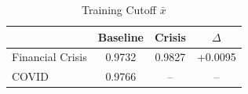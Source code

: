 \begin{table}[htbp]
  \centering
  \caption{Training Cutoff $\bar{x}$}
  \label{tab:xbar}
  \begin{tabular}{lccc}
    \toprule
    & Baseline & Crisis & $\Delta$ \\
    \midrule
    Financial Crisis & 0.9732 & 0.9827 & +0.0095 \\
    COVID & 0.9766 & -- & -- \\
    \bottomrule
  \end{tabular}
\end{table}